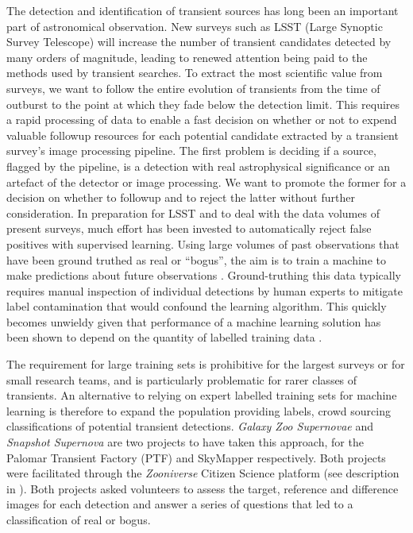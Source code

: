 \documentclass[a4paper,fleqn,usenatbib]{mnras}
\begin{document}
The detection and identification of transient sources has long been an important part of astronomical observation. New surveys such as LSST (Large Synoptic Survey Telescope)\citep{Ivezic08} will increase the number of transient candidates detected by many orders of magnitude, leading to renewed attention being paid to the methods used by transient searches.  To extract the most scientific value from surveys, we want to follow the entire evolution of transients from the time of outburst to the point at which they fade below the detection limit.  This requires a rapid processing of data to enable a fast decision on whether or not to expend valuable followup resources for each potential candidate extracted by a transient survey's image processing pipeline.  The first problem is deciding if a source, flagged by the pipeline, is a detection with real astrophysical significance or an artefact of the detector or image processing.  We want to promote the former for a decision on whether to followup  and to reject the latter without further consideration.  In preparation for LSST and to deal with the data volumes of present surveys, much effort has been invested to automatically reject false positives with supervised learning. Using large volumes of past observations that have been ground truthed as real or ``bogus'', the aim is to train a machine to make predictions about future observations \citep{Bloom12, Brink13, Goldstein15, duBuisson15, Donalek08, Romano06, Bailey07}.  Ground-truthing this data typically requires manual inspection of individual detections by human experts to mitigate label contamination that would confound the learning algorithm.  This quickly becomes unwieldy given that performance of a machine learning solution has been shown to depend on the quantity of labelled training data \citep{Banko01}.



The requirement for large training sets is prohibitive for the largest surveys or for small research teams, and is particularly problematic for rarer classes of transients.  An alternative to relying on expert labelled training sets for machine learning is therefore to expand the population providing labels, crowd sourcing classifications of potential transient detections.  \textit{Galaxy Zoo Supernovae} \citep{Smith11} and \textit{Snapshot Supernova} \citep{Campbell15} are two projects to have taken this approach, for the Palomar Transient Factory (PTF) \citep{Rau09, Law09} and SkyMapper \citep{Keller07} respectively.  Both projects were facilitated through the \textit{Zooniverse} Citizen Science platform (see description in \citet{Marshall16}).  Both projects asked volunteers to assess the target, reference and difference images for each detection and answer a series of questions that led to a classification of real or bogus.  
\end{document}
